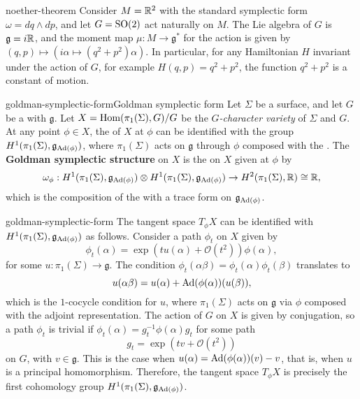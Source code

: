 \begin{example}{noether-theorem}
    Consider $M = \mathbb{R}^2$ with the standard symplectic form $\omega = dq \wedge dp$, and let $G = \textup{SO}(2)$ act naturally on $M$. The Lie algebra of $G$ is $\mathfrak{g} = i\mathbb{R}$, and the moment map $\mu : M \to \mathfrak{g}^*$ for the action is given by $(q, p) \mapsto (i \alpha \mapsto (q^2 + p^2) \alpha)$.
    In particular, for any Hamiltonian $H$ invariant under the action of $G$, for example $H(q, p) = q^2 + p^2$, the function $q^2 + p^2$ is a constant of motion.
\end{example}

\begin{topic}{goldman-symplectic-form}{Goldman symplectic form}
    Let $\Sigma$ be a  surface, and let $G$ be a  with  $\mathfrak{g}$.
    Let $X = \operatorname{Hom}(\pi_1(\Sigma), G) / G$ be the \textit{$G$-character variety} of $\Sigma$ and $G$. At any point $\phi \in X$, the  of $X$ at $\phi$ can be identified with the  group $H^1(\pi_1(\Sigma), \mathfrak{g}_{\textup{Ad}(\phi)})$, where $\pi_1(\Sigma)$ acts on $\mathfrak{g}$ through $\phi$ composed with the . The \textbf{Goldman symplectic structure} on $X$ is the  on $X$ given at $\phi$ by
    \[ \omega_\phi : H^1(\pi_1(\Sigma), \mathfrak{g}_{\textup{Ad}(\phi)}) \otimes H^1(\pi_1(\Sigma), \mathfrak{g}_{\textup{Ad}(\phi)}) \to H^2(\pi_1(\Sigma), \mathbb{R}) \cong \mathbb{R} , \]
    which is the composition of the  with a trace form on $\mathfrak{g}_{\textup{Ad}(\phi)}$.
\end{topic}

\begin{example}{goldman-symplectic-form}
    The tangent space $T_\phi X$ can be identified with $H^1(\pi_1(\Sigma), \mathfrak{g}_{\textup{Ad}(\phi)})$ as follows. Consider a path $\phi_t$ on $X$ given by
    \[ \phi_t(\alpha) = \exp(t u(\alpha) + \mathcal{O}(t^2)) \phi(\alpha) , \]
    for some $u : \pi_1(\Sigma) \to \mathfrak{g}$. The condition $\phi_t(\alpha \beta) = \phi_t(\alpha) \phi_t(\beta)$ translates to
    \[ u(\alpha \beta) = u(\alpha) + \textup{Ad}(\phi(\alpha))(u(\beta)) , \]
    which is the $1$-cocycle condition for $u$, where $\pi_1(\Sigma)$ acts on $\mathfrak{g}$ via $\phi$ composed with the adjoint representation. The action of $G$ on $X$ is given by conjugation, so a path $\phi_t$ is trivial if $\phi_t(\alpha) = g_t^{-1} \phi(\alpha) g_t$ for some path
    \[ g_t = \exp(t v + \mathcal{O}(t^2)) \]
    on $G$, with $v \in \mathfrak{g}$. This is the case when $u(\alpha) = \textup{Ad}(\phi(\alpha))(v) - v$, that is, when $u$ is a principal homomorphism. Therefore, the tangent space $T_\phi X$ is precisely the first cohomology group $H^1(\pi_1(\Sigma), \mathfrak{g}_{\textup{Ad}(\phi)})$.
\end{example}

